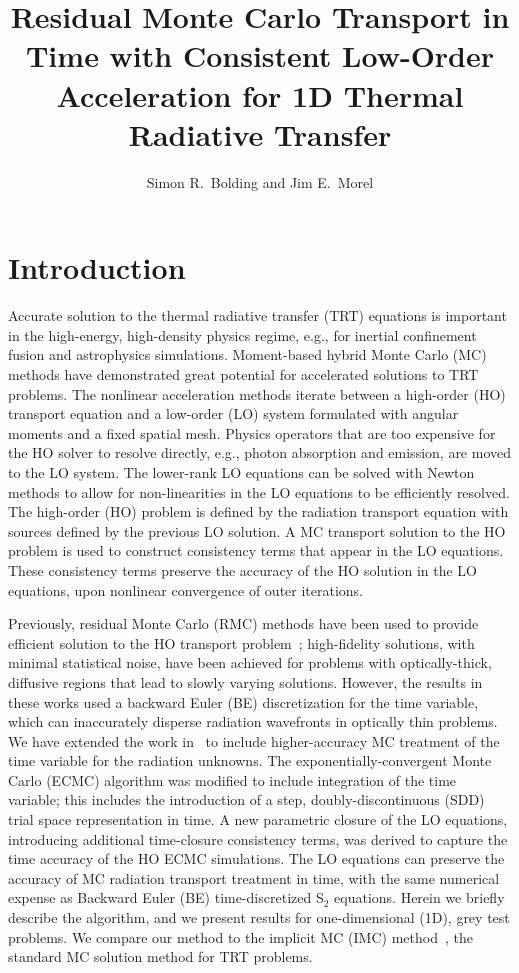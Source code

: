 \documentclass{anstrans}
\title{Residual Monte Carlo Transport in Time with Consistent Low-Order Acceleration for
    1D Thermal Radiative Transfer}
\author{Simon R.~Bolding and Jim E.~Morel}
\institute{Texas A\&M University Nuclear Engineering Department, 
}
\begin{document}
\section{Introduction}

Accurate solution to the thermal radiative transfer (TRT) equations is important in the
high-energy, high-density physics regime, e.g., for inertial
confinement fusion and astrophysics simulations.  Moment-based hybrid Monte Carlo (MC)
methods have demonstrated great potential for accelerated
solutions to TRT problems.   The nonlinear acceleration methods iterate between a
high-order (HO) transport equation and a low-order (LO) system formulated with angular moments
and a fixed spatial mesh.  Physics operators that
are too expensive for the HO solver to resolve directly, e.g., photon absorption and emission,
are moved to the LO system. The lower-rank LO equations can be solved with Newton
methods to allow for non-linearities in the LO equations to be efficiently
resolved.  The high-order (HO) problem is defined by the radiation transport equation with
sources defined by the previous LO solution. A MC transport solution to the HO
problem is used to construct consistency terms that appear in the LO equations. These consistency terms preserve the accuracy of the HO
solution in the LO equations, upon nonlinear convergence of outer iterations.

Previously, residual Monte Carlo (RMC) methods have been used to provide efficient
solution to the HO transport problem~\cite{rmc,bolding_nse}; high-fidelity solutions,
with minimal statistical noise, have been achieved for problems with optically-thick, diffusive
regions that lead to slowly varying
solutions.  However, the results in these works used a backward
Euler (BE) discretization for the time variable, which can inaccurately disperse radiation
wavefronts in optically thin problems. We have extended the work
in~\cite{bolding_nse} to include higher-accuracy MC treatment of the time variable for the
radiation unknowns. The exponentially-convergent Monte Carlo (ECMC)
algorithm was modified to include integration of the time variable;
this includes the introduction of a step, doubly-discontinuous (SDD) trial space representation
in time.  A new
parametric closure of the LO equations, introducing additional time-closure consistency
terms, was derived to capture the time accuracy of the HO
ECMC simulations.  The LO equations can preserve the accuracy of MC radiation transport treatment in
time, with the same numerical expense as Backward Euler (BE) time-discretized S$_2$
equations. 
Herein we briefly describe the algorithm, and we present results for
one-dimensional (1D), grey test problems.  We compare our method to the implicit MC
(IMC) method~\cite{wollaber_review}, the standard MC solution
method for TRT problems.
\end{document}
